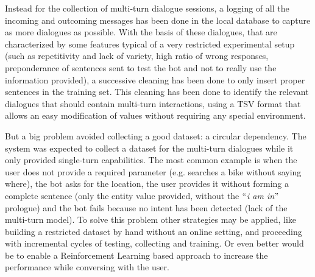 Instead for the collection of multi-turn dialogue sessions, a logging of all the incoming and outcoming messages has been done in the local database to capture as more dialogues as possible. With the basis of these dialogues, that are characterized by some features typical of a very restricted experimental setup (such as repetitivity and lack of variety, high ratio of wrong responses, preponderance of sentences sent to test the bot and not to really use the information provided), a successive cleaning has been done to only insert proper sentences in the training set. This cleaning has been done to identify the relevant dialogues that should contain multi-turn interactions, using a TSV format that allows an easy modification of values without requiring any special environment.

But a big problem avoided collecting a good dataset: a circular dependency. The system was expected to collect a dataset for the multi-turn dialogues while it only provided single-turn capabilities. The most common example is when the user does not provide a required parameter (e.g. searches a bike without saying where), the bot asks for the location, the user provides it without forming a complete sentence (only the entity value provided, without the $``$\textit{i am in}$"$  prologue) and the bot fails because no intent has been detected (lack of the multi-turn model). To solve this problem other strategies may be applied, like building a restricted dataset by hand without an online setting, and proceeding with incremental cycles of testing, collecting and training. Or even better would be to enable a Reinforcement Learning based approach to increase the performance while conversing with the user.


